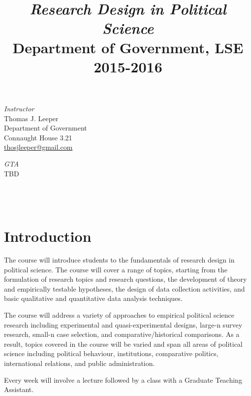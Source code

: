\documentclass[12pt,a4paper]{article}
\title{\textit{Research Design in Political Science}\\Department of Government, LSE\\2015-2016}
\begin{document}
\nobibliography*

\maketitle

\faketableofcontents

\begin{minipage}[b]{0.5\linewidth}
\textit{Instructor}\\
Thomas J. Leeper\\
Department of Government\\
Connaught House 3.21\\
\href{mailto:thosjleeper@gmail.com}{thosjleeper@gmail.com}\\
\end{minipage}
\begin{minipage}[b]{0.5\linewidth}
\textit{GTA}\\
TBD\\
\hspace{1em}\\
\hspace{1em}\\
\hspace{1em}\\
\end{minipage}


\section{Introduction}
The course will introduce students to the fundamentals of research design in political science. The course will cover a range of topics, starting from the formulation of research topics and research questions, the development of theory and empirically testable hypotheses, the design of data collection activities, and basic qualitative and quantitative data analysis techniques. 

The course will address a variety of approaches to empirical political science research including experimental and quasi-experimental designs, large-n survey research, small-n case selection, and comparative/historical comparisons. As a result, topics covered in the course will be varied and span all areas of political science including political behaviour, institutions, comparative politics, international relations, and public administration.

Every week will involve a lecture followed by a class with a Graduate Teaching Assistant. 

\clearpage
\end{document}
